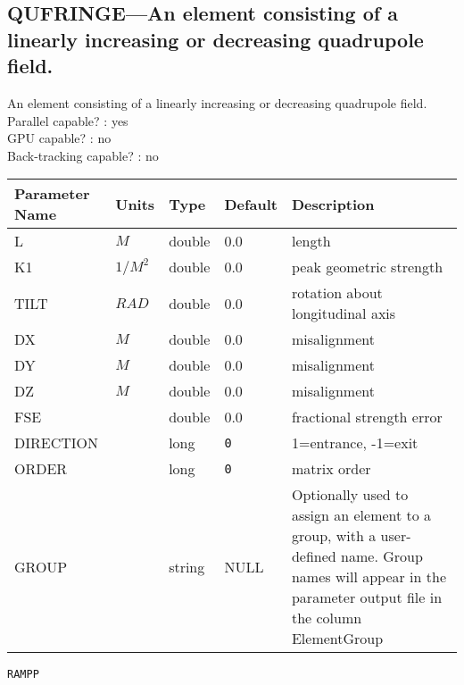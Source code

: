 \subsection{QUFRINGE---An element consisting of a linearly increasing or decreasing quadrupole field.}
An element consisting of a linearly increasing or decreasing quadrupole field.
\\
Parallel capable? : yes\\
GPU capable? : no\\
Back-tracking capable? : no\\
\begin{tabular}{|l|l|l|l|p{\descwidth}|} \hline
Parameter Name & Units & Type & Default & Description \\ \hline 
L & $M$ & double &  0.0 & length  \\ \hline 
K1 & $1/M^{2}$ & double &  0.0 & peak geometric strength  \\ \hline 
TILT & $RAD$ & double &  0.0 & rotation about longitudinal axis  \\ \hline 
DX & $M$ & double &  0.0 & misalignment  \\ \hline 
DY & $M$ & double &  0.0 & misalignment  \\ \hline 
DZ & $M$ & double &  0.0 & misalignment  \\ \hline 
FSE &  & double &  0.0 & fractional strength error  \\ \hline 
DIRECTION &  & long &  \verb|0| & 1=entrance, -1=exit  \\ \hline 
ORDER &  & long &  \verb|0| & matrix order  \\ \hline 
GROUP &  & string & NULL & Optionally used to assign an element to a group, with a user-defined name.  Group names will appear in the parameter output file in the column ElementGroup  \\ \hline 
\end{tabular}

\newpage
\begin{center}{\Large\verb|RAMPP|}\end{center}
